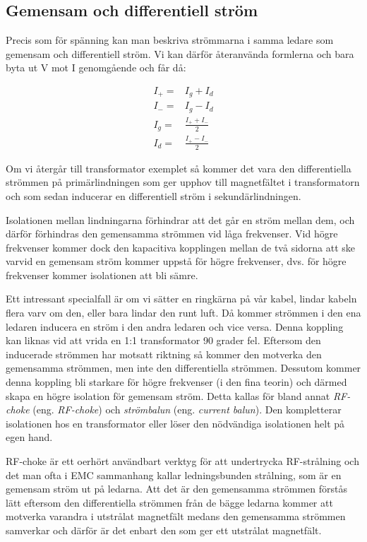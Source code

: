 \subsection{Gemensam och differentiell ström}
\label{comdiffi}

Precis som för spänning kan man beskriva strömmarna i samma ledare som
gemensam och differentiell ström. Vi kan därför återanvända formlerna och bara
byta ut V mot I genomgående och får då:

\begin{eqnarray}
I_+ = & I_g + I_d\\
I_- = & I_g - I_d\\
I_g = & \frac{I_+ + I_-}{2}\\
I_d = & \frac{I_+ - I_-}{2}
\end{eqnarray}

Om vi återgår till transformator exemplet så kommer det vara den differentiella
strömmen på primärlindningen som ger upphov till magnetfältet i transformatorn
och som sedan inducerar en differentiell ström i sekundärlindningen.

Isolationen mellan lindningarna förhindrar att det går en ström mellan dem,
och därför förhindras den gemensamma strömmen vid låga frekvenser. Vid högre
frekvenser kommer dock den kapacitiva kopplingen mellan de två sidorna att
ske varvid en gemensam ström kommer uppstå för högre frekvenser, dvs. för
högre frekvenser kommer isolationen att bli sämre.

Ett intressant specialfall är om vi sätter en ringkärna på vår kabel, lindar
kabeln flera varv om den, eller bara lindar den runt luft. Då kommer strömmen
i den ena ledaren inducera en ström i den andra ledaren och vice versa.
Denna koppling kan liknas vid att vrida en 1:1 transformator 90 grader fel.
Eftersom den inducerade strömmen har motsatt riktning så kommer den motverka
den gemensamma strömmen, men inte den differentiella strömmen. Dessutom kommer
denna koppling bli starkare för högre frekvenser (i den fina teorin) och
därmed skapa en högre isolation för gemensam ström. Detta kallas för
bland annat \emph{RF-choke} (eng. \emph{RF-choke}) och \emph{strömbalun} (eng.
\emph{current balun}). Den kompletterar isolationen hos en transformator
eller löser den nödvändiga isolationen helt på egen hand.

RF-choke är ett oerhört användbart verktyg för att undertrycka RF-strålning
och det man ofta i EMC sammanhang kallar ledningsbunden strålning, som är en
gemensam ström ut på ledarna. Att det är den gemensamma strömmen förstås lätt
eftersom den differentiella strömmen från de bägge ledarna kommer att motverka
varandra i utstrålat magnetfält medans den gemensamma strömmen samverkar och
därför är det enbart den som ger ett utstrålat magnetfält.

